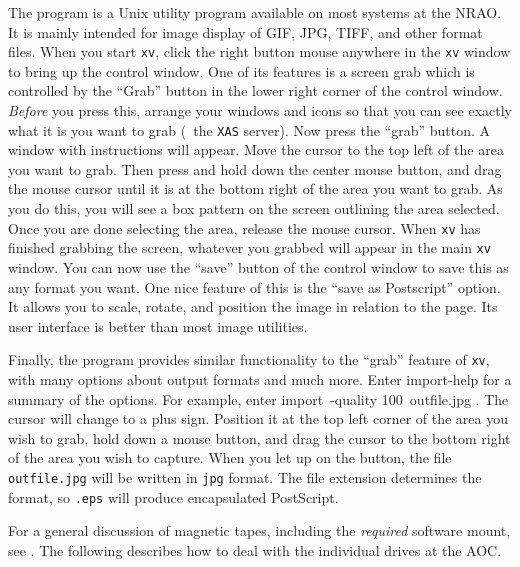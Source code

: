      The {\tt {}} program is a Unix utility program available
on most systems at the NRAO\@.  It is mainly intended for image
display of GIF, JPG, TIFF, and other format files.  When you start
{\tt xv}, click the right button mouse anywhere in the {\tt xv} window
to bring up the control window.  One of its features is a screen grab
which is controlled by the ``Grab'' button in the lower right corner
of the control window.  {\it Before\/} you press this, arrange your
windows and icons so that you can see exactly what it is you want to
grab (\eg\ the {\tt XAS} server).  Now press the ``grab'' button.  A
window with instructions will appear.  Move the cursor to the top left
of the area you want to grab.  Then press and hold down the center
mouse button, and drag the mouse cursor until it is at the bottom
right of the area you want to grab. As you do this, you will see a box
pattern on the screen outlining the area selected.  Once you are done
selecting the area, release the mouse cursor.  When {\tt xv} has
finished grabbing the screen, whatever you grabbed will appear in the
main {\tt xv} window.  You can now use the ``save'' button of the
control window to save this as any format you want.  One nice feature
of this is the ``save as Postscript'' option.  It allows you to scale,
rotate, and position the image in relation to the page.  Its user
interface is better than most image utilities.

     Finally, the {\tt {}} program provides similar
functionality to the ``grab'' feature of {\tt xv}, with many options
about output formats and much more.  Enter {\us import\qs -help \CR}
for a summary of the options.  For example, enter {\us import\qs\
-quality 100\qs\ outfile.jpg \CR}.  The cursor will change to a plus
sign.  Position it at the top left corner of the area you wish to
grab, hold down a mouse button, and drag the cursor to the bottom
right of the area you wish to capture.  When you let up on the button,
the file {\tt outfile.jpg} will be written in {\tt jpg} format. The
file extension determines the format, so {\tt .eps} will produce
encapsulated PostScript.


    For a general discussion of magnetic tapes, including the {\it
required\/} software mount, see \Sec{magtape}.  The following
describes how to deal with the individual  drives at the
\hbox{AOC}.\iodx{magnetic tape}


